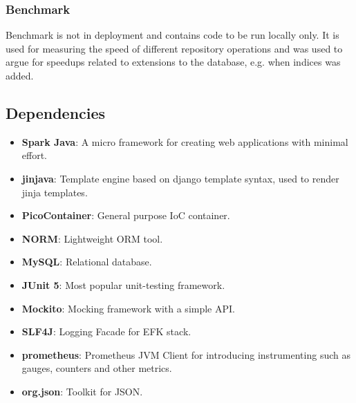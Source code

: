 \subsubsection{Benchmark}
Benchmark is not in deployment and contains code to be run locally only. It is used for measuring the speed of different repository operations and was used to argue for speedups related to extensions to the database, e.g. when indices was added.


\subsection{Dependencies }
\begin{itemize}
    \item \textbf{Spark Java}: A micro framework for creating web applications with minimal effort. %
    \item \textbf{jinjava}: Template engine based on django template syntax, used to render jinja templates.
    \item \textbf{PicoContainer}: General purpose IoC container.
    \item \textbf{NORM}: Lightweight ORM tool. %
    \item \textbf{MySQL}: Relational database.%
    \item \textbf{JUnit 5}: Most popular unit-testing framework.
    \item \textbf{Mockito}: Mocking framework with a simple API.
    \item \textbf{SLF4J}: Logging Facade for EFK stack. 
    \item \textbf{prometheus}: Prometheus JVM Client for introducing instrumenting such as gauges, counters and other metrics.
    \item \textbf{org.json}: Toolkit for JSON.
\end{itemize}
